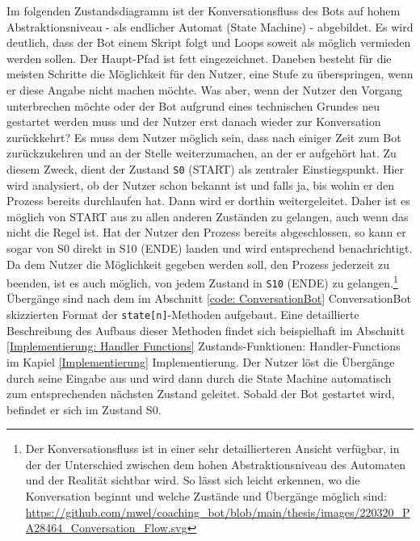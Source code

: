 	Im folgenden Zustandsdiagramm ist der Konversationsfluss des Bots auf hohem Abstraktionsniveau - als endlicher Automat (State Machine) - abgebildet. Es wird deutlich, dass der Bot einem Skript folgt und Loops soweit als möglich vermieden werden sollen. Der Haupt-Pfad ist fett eingezeichnet. Daneben besteht für die meisten Schritte die Möglichkeit für den Nutzer, eine Stufe zu überspringen, wenn er diese Angabe nicht machen möchte. Was aber, wenn der Nutzer den Vorgang unterbrechen möchte oder der Bot aufgrund eines technischen Grundes neu gestartet werden muss und der Nutzer erst danach wieder zur Konversation zurückkehrt? Es muss dem Nutzer möglich sein, dass nach einiger Zeit zum Bot zurückzukehren und an der Stelle weiterzumachen, an der er aufgehört hat. Zu diesem Zweck, dient der Zustand \verb|S0| (START) als zentraler Einstiegspunkt. Hier wird analysiert, ob der Nutzer schon bekannt ist und falls ja, bis wohin er den Prozess bereits durchlaufen hat. Dann wird er dorthin weitergeleitet. Daher ist es möglich von START aus zu allen anderen Zuständen zu gelangen, auch wenn das nicht die Regel ist. Hat der Nutzer den Prozess bereits abgeschlossen, so kann er sogar von S0 direkt in S10 (ENDE) landen und wird entsprechend benachrichtigt. Da dem Nutzer die Möglichkeit gegeben werden soll, den Prozess jederzeit zu beenden, ist es auch möglich, von jedem Zustand in \verb|S10| (ENDE) zu gelangen.\footnote{Der Konversationsfluss ist in einer sehr detaillierteren Ansicht verfügbar, in der der Unterschied zwischen dem hohen Abstraktionsniveau des Automaten und der Realität sichtbar wird. So lässt sich leicht erkennen, wo die Konversation beginnt und welche Zustände und Übergänge möglich sind: \url{https://github.com/mwel/coaching_bot/blob/main/thesis/images/220320_PA28464_Conversation_Flow.svg}} Übergänge sind nach dem im Abschnitt \ref{code: ConversationBot} ConversationBot skizzierten Format der \verb|state[n]|-Methoden aufgebaut. Eine detaillierte Beschreibung des Aufbaus dieser Methoden findet sich beispielhaft im Abschnitt \ref*{Implementierung: Handler Functions} Zustands-Funktionen: Handler-Functions im Kapiel \ref*{Implementierung} Implementierung. Der Nutzer löst die Übergänge durch seine Eingabe aus und wird dann durch die State Machine automatisch zum entsprechenden nächsten Zustand geleitet.
	Sobald der Bot gestartet wird, befindet er sich im Zustand S0.
